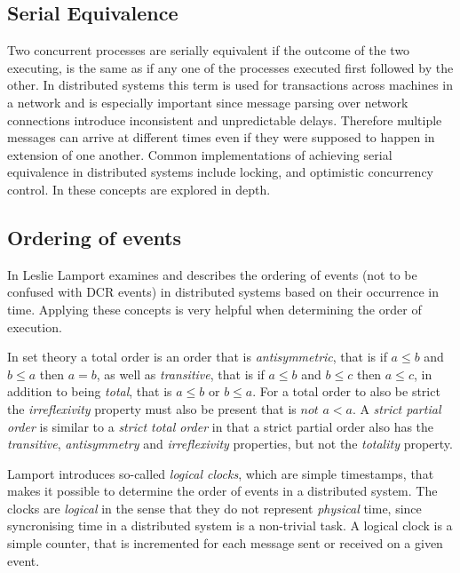 		\subsection{Serial Equivalence}
		Two concurrent processes are serially equivalent if the outcome of the two executing, is the same as if any one of the processes executed first followed by the other. In distributed systems this term is used for transactions across machines in a network and is especially important since message parsing over network connections introduce inconsistent and unpredictable delays. Therefore multiple messages can arrive at different times even if they were supposed to happen in extension of one another. Common implementations of achieving serial equivalence in distributed systems include locking, and optimistic concurrency control. In \cite{Coulouris:2011:DSC:2029110} these concepts are explored in depth.
		
		\subsection{Ordering of events}\label{subsec:orderingofevents}
		In \cite{Lamport:1978:TCO:359545.359563} Leslie Lamport examines and describes the ordering of events (not to be confused with DCR events) in distributed systems based on their occurrence in time. Applying these concepts is very helpful when determining the order of execution. 
		
		In set theory a total order is an order that is \textit{antisymmetric}, that is if $a \leq b$ and $b \leq a$ then $a = b$, as well as \textit{transitive}, that is if $a \leq b$ and $b \leq c$ then $a \leq c$, in addition to being \textit{total}, that is $a \leq b$ or $b \leq a$. For a total order to also be strict the \textit{irreflexivity} property must also be present that is $not$ $a < a$. A \textit{strict partial order} is similar to a \textit{strict total order} in that a strict partial order also has the \textit{transitive}, \textit{antisymmetry} and \textit{irreflexivity} properties, but not the \textit{totality} property.
		
		\newpar Lamport introduces so-called \textit{logical clocks}, which are simple timestamps, that makes it possible to determine the order of events in a distributed system. The clocks are \textit{logical} in the sense that they do not represent \textit{physical} time, since syncronising time in a distributed system is a non-trivial task. A logical clock is a simple counter, that is incremented for each message sent or received on a given event. 
		
